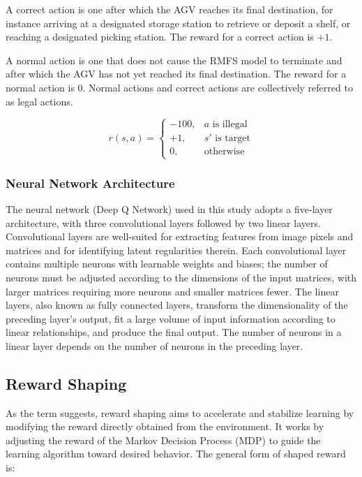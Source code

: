 A correct action is one after which the AGV reaches its final destination, for instance arriving at a designated storage station to retrieve or deposit a shelf, or reaching a designated picking station. The reward for a correct action is $+1$.

A normal action is one that does not cause the RMFS model to terminate and after which the AGV has not yet reached its final destination. The reward for a normal action is $0$. Normal actions and correct actions are collectively referred to as legal actions.

\begin{equation}
r(s,a)=
\begin{cases}
-100, & \text{$a$ is illegal} \\
+1,   & \text{$s'$ is target} \\
0,    & \text{otherwise}
\end{cases}
\end{equation}

\subsubsection{Neural Network Architecture}

The neural network (Deep Q Network) used in this study adopts a five-layer architecture, with three convolutional layers followed by two linear layers. Convolutional layers are well-suited for extracting features from image pixels and matrices and for identifying latent regularities therein. Each convolutional layer contains multiple neurons with learnable weights and biases; the number of neurons must be adjusted according to the dimensions of the input matrices, with larger matrices requiring more neurons and smaller matrices fewer. The linear layers, also known as fully connected layers, transform the dimensionality of the preceding layer's output, fit a large volume of input information according to linear relationships, and produce the final output. The number of neurons in a linear layer depends on the number of neurons in the preceding layer.

\subsection{Reward Shaping}

As the term suggests, reward shaping aims to accelerate and stabilize learning by modifying the reward directly obtained from the environment. It works by adjusting the reward of the Markov Decision Process (MDP) to guide the learning algorithm toward desired behavior. The general form of shaped reward is:

